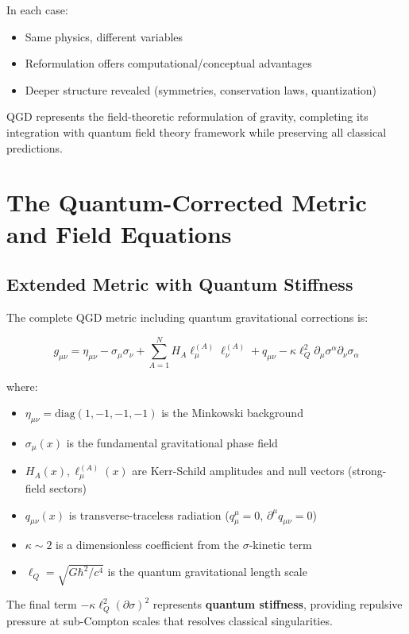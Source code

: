 \documentclass[11pt,a4paper]{article}
\theoremstyle{definition}
\theoremstyle{remark}
\begin{document}
	In each case:
	\begin{itemize}
		\item Same physics, different variables
		\item Reformulation offers computational/conceptual advantages
		\item Deeper structure revealed (symmetries, conservation laws, quantization)
	\end{itemize}
	
	QGD represents the field-theoretic reformulation of gravity, completing its integration with quantum field theory framework while preserving all classical predictions.
	\section{The Quantum-Corrected Metric and Field Equations}
	
	\subsection{Extended Metric with Quantum Stiffness}
	
	The complete QGD metric including quantum gravitational corrections is:
	
	\begin{equation}\label{eq:quantum_metric}
		\boxed{g_{\mu\nu} = \eta_{\mu\nu} - \sigma_\mu\sigma_\nu + \sum_{A=1}^N H_A\ell_\mu^{(A)}\ell_\nu^{(A)} + q_{\mu\nu} - \kappa\ell_Q^2\partial_\mu\sigma^\alpha\partial_\nu\sigma_\alpha}
	\end{equation}
	
	where:
	\begin{itemize}
		\item $\eta_{\mu\nu} = \text{diag}(1,-1,-1,-1)$ is the Minkowski background
		\item $\sigma_\mu(x)$ is the fundamental gravitational phase field
		\item $H_A(x), \ell_\mu^{(A)}(x)$ are Kerr-Schild amplitudes and null vectors (strong-field sectors)
		\item $q_{\mu\nu}(x)$ is transverse-traceless radiation ($q^\mu_\mu = 0$, $\partial^\mu q_{\mu\nu} = 0$)
		\item $\kappa \sim 2$ is a dimensionless coefficient from the $\sigma$-kinetic term
		\item $\ell_Q = \sqrt{G\hbar^2/c^4}$ is the quantum gravitational length scale
	\end{itemize}
	
	The final term $-\kappa\ell_Q^2(\partial\sigma)^2$ represents \textbf{quantum stiffness}, providing repulsive pressure at sub-Compton scales that resolves classical singularities.
	
\end{document}

